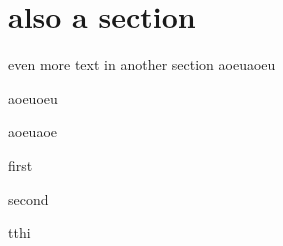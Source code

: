 \section{also a section}
even more text in another section
aoeuaoeu

aoeuoeu \cite{Hansen_2015}

aoeuaoe \cite{Hansen_2011}

first

second

tthi
